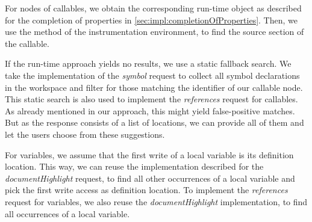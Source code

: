     For nodes of callables, we obtain the corresponding run-time object as described for the completion of properties in \autoref{sec:impl:completionOfProperties}. Then, we use the method  of the instrumentation environment, to find the source section of the callable.

    If the run-time approach yields no results, we use a static fallback search. We take the implementation of the \emph{symbol} request to collect all symbol declarations in the workspace and filter for those matching the identifier of our callable node. This static search is also used to implement the \emph{references} request for callables. As already mentioned in our approach, this might yield false-positive matches. But as the response consists of a list of locations, we can provide all of them and let the users choose from these suggestions.

    For variables, we assume that the first write of a local variable is its definition location. This way, we can reuse the implementation described for the \emph{documentHighlight} request, to find all other occurrences of a local variable and pick the first write access as definition location. To implement the \emph{references} request for variables, we also reuse the \emph{documentHighlight} implementation, to find all occurrences of a local variable.


